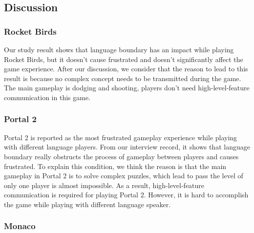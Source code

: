 \subsection{Discussion}
\subsubsection{Rocket Birds}

Our study result shows that language boundary has an impact while playing Rocket Birds, but it doesn't cause frustrated and doesn't significantly affect the game experience. After our discussion, we consider that the reason to lead to this result is because no complex concept needs to be transmitted during the game. The main gameplay is dodging and shooting, players don't need high-level-feature communication in this game.


\subsubsection{Portal 2}

Portal 2 is reported as the most frustrated gameplay experience while playing with different language players. From our interview record, it shows that language boundary really obstructs the process of gameplay between players and causes frustrated. To explain this condition, we think the reason is that the main gameplay in Portal 2 is to solve complex puzzles, which lead to pass the level of only one player is almost impossible. As a result, high-level-feature communication is required for playing Portal 2. However, it is hard to accomplish the game while playing with different language speaker.


\subsubsection{Monaco}

